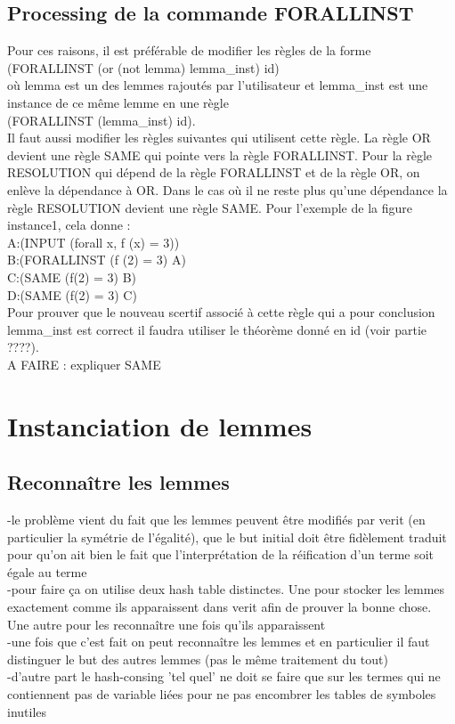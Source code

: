 \documentclass[11pt]{article}
\begin{document}
\subsection{Processing de la commande FORALLINST} \label{processing_forallinst}

Pour ces raisons, il est préférable de modifier les règles de la forme \\
     (FORALLINST (or (not lemma) lemma\_inst) id)\\
où lemma est un des lemmes rajoutés par l'utilisateur et lemma\_inst est une instance de ce même lemme en une règle \\

(FORALLINST (lemma\_inst) id).\\

Il faut aussi modifier les règles suivantes qui utilisent cette règle. La règle OR devient une règle SAME qui pointe vers la règle FORALLINST. Pour la règle RESOLUTION qui dépend de la règle FORALLINST et de la règle OR, on enlève la dépendance à OR. Dans le cas où il ne reste plus qu'une dépendance la règle RESOLUTION devient une règle SAME. Pour l'exemple de la figure instance1, cela donne : \\

A:(INPUT (forall x, f (x) = 3)) \\
B:(FORALLINST (f (2) = 3) A) \\
C:(SAME (f(2) = 3) B) \\
D:(SAME (f(2) = 3) C) \\

Pour prouver que le nouveau scertif associé à cette règle qui a pour conclusion lemma\_inst est correct il faudra utiliser le théorème donné en id (voir partie ????).\\

A FAIRE : expliquer SAME


\section{Instanciation de lemmes} \label{instanciations}

\subsection{Reconnaître les lemmes}
-le problème vient du fait que les lemmes peuvent être modifiés par verit (en particulier la symétrie de l'égalité), que le but initial doit être fidèlement traduit pour qu'on ait bien le fait que l'interprétation de la réification d'un terme soit égale au terme \\
-pour faire ça on utilise deux hash table distinctes. Une pour stocker les lemmes exactement comme ils apparaissent dans verit afin de prouver la bonne chose. Une autre pour les reconnaître une fois qu'ils apparaissent\\
-une fois que c'est fait on peut reconnaître les lemmes et en particulier il faut distinguer le but des autres lemmes (pas le même traitement du tout)\\
-d'autre part le hash-consing 'tel quel' ne doit se faire que sur les termes qui ne contiennent pas de variable liées pour ne pas encombrer les tables de symboles inutiles\\
\end{document}
